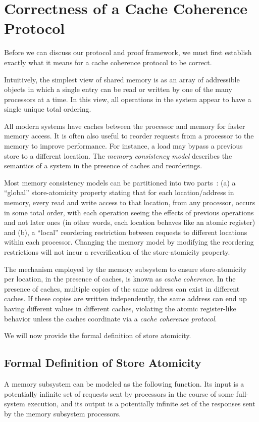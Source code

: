 \section{Correctness of a Cache Coherence Protocol}
\label{Background}

Before we can discuss our protocol and proof framework, we must first establish
exactly what it means for a cache coherence protocol to be correct. 

Intuitively, the simplest view of shared memory is as an array of addressible
objects in which a single entry can be read or written by one of the many
processors at a time.  In this view, all operations in the system appear to
have a single unique total ordering.

All modern systems have caches between the processor and memory for faster
memory access. It is often also useful to reorder requests from a processor to
the memory to improve performance. For instance, a load may bypass a previous
store to a different location. The \emph{memory consistency model} describes
the semantics of a system in the presence of caches and reorderings.

Most memory consistency models can be partitioned into two
parts~\cite{Arvind-memory-model}: (a) a ``global'' store-atomicity property
stating that for each location/address in memory, every read and write access
to that location, from any processor, occurs in some total order, with
each operation seeing the effects of previous operations and not later ones (in
other words, each location behaves like an atomic register) and (b), a
``local'' reordering restriction between requests to different locations within
each processor. Changing the memory model by modifying the reordering
restrictions will not incur a reverification of the store-atomicity property.

The mechanism employed by the memory subsystem to ensure store-atomicity per
location, in the presence of caches, is known as \emph{cache coherence}. In the
presence of caches, multiple copies of the same address can exist in different
caches. If these copies are written independently, the same address can end up
having different values in different caches, violating the atomic register-like
behavior unless the caches coordinate via a \emph{cache coherence protocol}.

We will now provide the formal definition of store atomicity.

\subsection{Formal Definition of Store Atomicity}
A memory subsystem can be modeled as the following function. Its input is a
potentially infinite set of requests sent by processors in the course of some
full-system execution, and its output is a potentially infinite set of
the responses sent by the memory subsystem processors.

